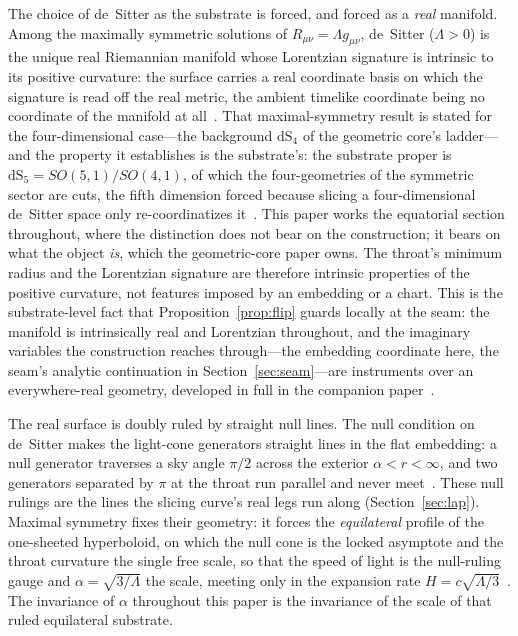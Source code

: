 \documentclass[11pt,a4paper]{article}
\theoremstyle{definition}
\begin{document}
The choice of de~Sitter as the substrate is forced, and forced as a \emph{real} manifold. Among the maximally symmetric solutions of $R_{\mu\nu}=\Lambda g_{\mu\nu}$, de~Sitter ($\Lambda>0$) is the unique real Riemannian manifold whose Lorentzian signature is intrinsic to its positive curvature: the surface carries a real coordinate basis on which the signature is read off the real metric, the ambient timelike coordinate being no coordinate of the manifold at all~\cite{JanzenThesis}. That maximal-symmetry result is stated for the four-dimensional case---the background $\mathrm{dS}_4$ of the geometric core's ladder---and the property it establishes is the substrate's: the substrate proper is $\mathrm{dS}_5=SO(5,1)/SO(4,1)$, of which the four-geometries of the symmetric sector are cuts, the fifth dimension forced because slicing a four-dimensional de~Sitter space only re-coordinatizes it~\cite{JanzenGeometricCore,JanzenAlgebroid}. This paper works the equatorial section throughout, where the distinction does not bear on the construction; it bears on what the object \emph{is}, which the geometric-core paper owns. The throat's minimum radius and the Lorentzian signature are therefore intrinsic properties of the positive curvature, not features imposed by an embedding or a chart. This is the substrate-level fact that Proposition~\ref{prop:flip} guards locally at the seam: the manifold is intrinsically real and Lorentzian throughout, and the imaginary variables the construction reaches through---the embedding coordinate here, the seam's analytic continuation in Section~\ref{sec:seam}---are instruments over an everywhere-real geometry, developed in full in the companion paper~\cite{JanzenGeometricCore}.

The real surface is doubly ruled by straight null lines. The null condition on de~Sitter makes the light-cone generators straight lines in the flat embedding: a null generator traverses a sky angle $\pi/2$ across the exterior $\alpha<r<\infty$, and two generators separated by $\pi$ at the throat run parallel and never meet~\cite{JanzenThesis}. These null rulings are the lines the slicing curve's real legs run along (Section~\ref{sec:lap}). Maximal symmetry fixes their geometry: it forces the \emph{equilateral} profile of the one-sheeted hyperboloid, on which the null cone is the locked asymptote and the throat curvature the single free scale, so that the speed of light is the null-ruling gauge and $\alpha=\sqrt{3/\Lambda}$ the scale, meeting only in the expansion rate $H=c\sqrt{\Lambda/3}$~\cite{JanzenCRframework}. The invariance of $\alpha$ throughout this paper is the invariance of the scale of that ruled equilateral substrate.
\end{document}
